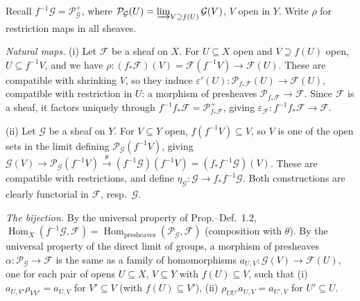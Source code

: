 \documentclass[11pt]{article}
\begin{document}
\pf
Recall $f^{-1}\mathcal G=\mathcal P_{\mathcal G}^+$, where $\mathcal P_{\mathcal G}(U)=\varinjlim_{V\supseteq f(U)}\mathcal G(V)$, $V$ open in $Y$. Write $\rho$ for restriction maps in all sheaves.

\emph{Natural maps.} (i) Let $\mathcal F$ be a sheaf on $X$. For $U\subseteq X$ open and $V\supseteq f(U)$ open, $U\subseteq f^{-1}V$, and we have $\rho\colon(f_*\mathcal F)(V)=\mathcal F(f^{-1}V)\to\mathcal F(U)$. These are compatible with shrinking $V$, so they induce $\varepsilon'(U)\colon\mathcal P_{f_*\mathcal F}(U)\to\mathcal F(U)$, compatible with restriction in $U$: a morphism of presheaves $\mathcal P_{f_*\mathcal F}\to\mathcal F$. Since $\mathcal F$ is a sheaf, it factors uniquely through $f^{-1}f_*\mathcal F=\mathcal P^+_{f_*\mathcal F}$, giving $\varepsilon_{\mathcal F}\colon f^{-1}f_*\mathcal F\to\mathcal F$.

(ii) Let $\mathcal G$ be a sheaf on $Y$. For $V\subseteq Y$ open, $f(f^{-1}V)\subseteq V$, so $V$ is one of the open sets in the limit defining $\mathcal P_{\mathcal G}(f^{-1}V)$, giving $\mathcal G(V)\to\mathcal P_{\mathcal G}(f^{-1}V)\xrightarrow{\theta}(f^{-1}\mathcal G)(f^{-1}V)=(f_*f^{-1}\mathcal G)(V)$. These are compatible with restrictions, and define $\eta_{\mathcal G}\colon\mathcal G\to f_*f^{-1}\mathcal G$. Both constructions are clearly functorial in $\mathcal F$, resp.\ $\mathcal G$.

\emph{The bijection.} By the universal property of Prop.--Def.~1.2, $\operatorname{Hom}_X(f^{-1}\mathcal G,\mathcal F)=\operatorname{Hom}_{\mathrm{presheaves}}(\mathcal P_{\mathcal G},\mathcal F)$ (composition with $\theta$). By the universal property of the direct limit of groups, a morphism of presheaves $\alpha\colon\mathcal P_{\mathcal G}\to\mathcal F$ is the same as a family of homomorphisms $a_{U,V}\colon\mathcal G(V)\to\mathcal F(U)$, one for each pair of opens $U\subseteq X$, $V\subseteq Y$ with $f(U)\subseteq V$, such that (i) $a_{U,V'}\rho_{VV'}=a_{U,V}$ for $V'\subseteq V$ (with $f(U)\subseteq V'$), (ii) $\rho_{UU'}a_{U,V}=a_{U',V}$ for $U'\subseteq U$.
\end{document}
